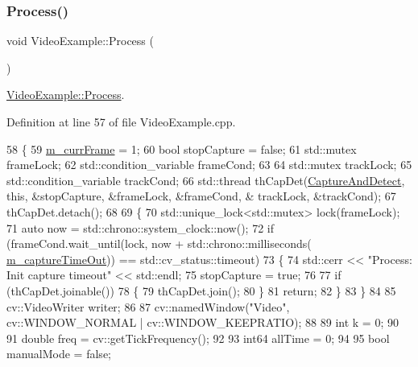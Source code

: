 \subsubsection{\texorpdfstring{Process()}{Process()}}
{\footnotesize\ttfamily void Video\+Example\+::\+Process (\begin{DoxyParamCaption}{ }\end{DoxyParamCaption})\hspace{0.3cm}{\ttfamily [inherited]}}



\mbox{\hyperlink{class_video_example_a87efc66a82c36ad3380623d30a12abf2}{Video\+Example\+::\+Process}}. 



Definition at line 57 of file Video\+Example.\+cpp.


\begin{DoxyCode}
58 \{
59     \mbox{\hyperlink{class_video_example_a4adccbe4084f68f10d966901b168a98a}{m\_currFrame}} = 1;
60     \textcolor{keywordtype}{bool} stopCapture = \textcolor{keyword}{false};
61     std::mutex frameLock;
62     std::condition\_variable frameCond;
63 
64     std::mutex trackLock;
65     std::condition\_variable trackCond;
66     std::thread thCapDet(\mbox{\hyperlink{class_video_example_ace8617201da40b6e230bd6c049b48aa0}{CaptureAndDetect}}, \textcolor{keyword}{this}, &stopCapture, &frameLock, &frameCond, &
      trackLock, &trackCond);
67     thCapDet.detach();
68 
69     \{
70         std::unique\_lock<std::mutex> lock(frameLock);
71         \textcolor{keyword}{auto} now = std::chrono::system\_clock::now();
72         \textcolor{keywordflow}{if} (frameCond.wait\_until(lock, now + std::chrono::milliseconds(
      \mbox{\hyperlink{class_video_example_aea3c9dd66a3464fab8c61a838aff0ccf}{m\_captureTimeOut}})) == std::cv\_status::timeout)
73         \{
74             std::cerr << \textcolor{stringliteral}{"Process: Init capture timeout"} << std::endl;
75             stopCapture = \textcolor{keyword}{true};
76 
77             \textcolor{keywordflow}{if} (thCapDet.joinable())
78             \{
79                 thCapDet.join();
80             \}
81             \textcolor{keywordflow}{return};
82         \}
83     \}
84 
85     cv::VideoWriter writer;
86 
87     cv::namedWindow(\textcolor{stringliteral}{"Video"}, cv::WINDOW\_NORMAL | cv::WINDOW\_KEEPRATIO);
88 
89     \textcolor{keywordtype}{int} k = 0;
90 
91     \textcolor{keywordtype}{double} freq = cv::getTickFrequency();
92 
93     int64 allTime = 0;
94 
95     \textcolor{keywordtype}{bool} manualMode = \textcolor{keyword}{false};

\end{DoxyCode}
